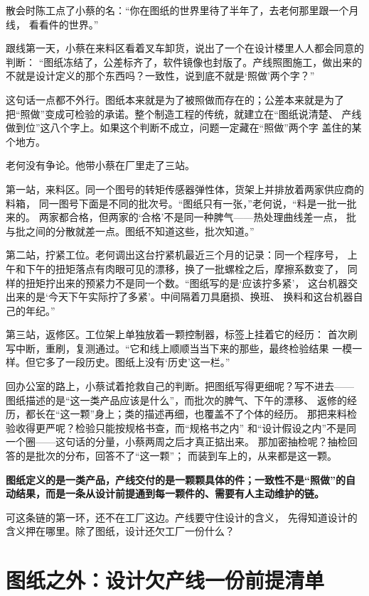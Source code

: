 散会时陈工点了小蔡的名：“你在图纸的世界里待了半年了，去老何那里跟一个月线，
看看件的世界。”

跟线第一天，小蔡在来料区看着叉车卸货，说出了一个在设计楼里人人都会同意的判断：
“图纸冻结了，公差标齐了，软件镜像也封版了。产线照图施工，做出来的
不就是设计定义的那个东西吗？一致性，说到底不就是‘照做’两个字？”

这句话一点都不外行。图纸本来就是为了被照做而存在的；公差本来就是为了
把“照做”变成可检验的承诺。整个制造工程的传统，就建立在“图纸说清楚、
产线做到位”这八个字上。如果这个判断不成立，问题一定藏在“照做”两个字
盖住的某个地方。

老何没有争论。他带小蔡在厂里走了三站。

第一站，来料区。同一个图号的转矩传感器弹性体，货架上并排放着两家供应商的料箱，
同一图号下面是不同的批次号。“图纸只有一张，”老何说，“料是一批一批来的。
两家都合格，但两家的‘合格’不是同一种脾气——热处理曲线差一点，
批与批之间的分散就差一点。图纸不知道这些，批次知道。”

第二站，拧紧工位。老何调出这台拧紧机最近三个月的记录：同一个程序号，
上午和下午的扭矩落点有肉眼可见的漂移，换了一批螺栓之后，摩擦系数变了，
同样的扭矩拧出来的预紧力不是同一个数。“图纸写的是‘应该拧多紧’，
这台机器交出来的是‘今天下午实际拧了多紧’。中间隔着刀具磨损、换班、
换料和这台机器自己的年纪。”

第三站，返修区。工位架上单独放着一颗控制器，标签上挂着它的经历：
首次刷写中断，重刷，复测通过。“它和线上顺顺当当下来的那些，最终检验结果
一模一样。但它多了一段历史。图纸上没有‘历史’这一栏。”

回办公室的路上，小蔡试着抢救自己的判断。把图纸写得更细呢？写不进去——
图纸描述的是“这一类产品应该是什么”，而批次的脾气、下午的漂移、
返修的经历，都长在“这一颗”身上；类的描述再细，也覆盖不了个体的经历。
那把来料检验收得更严呢？检验只能按规格书查，而“规格书之内”
和“设计假设之内”不是同一个圈——这句话的分量，小蔡两周之后才真正掂出来。
那加密抽检呢？抽检回答的是批次的分布，回答不了“这一颗”；
而装到车上的，从来都是这一颗。

\textbf{图纸定义的是一类产品，产线交付的是一颗颗具体的件；一致性不是“照做”的自动结果，而是一条从设计前提通到每一颗件的、需要有人主动维护的链。}

可这条链的第一环，还不在工厂这边。产线要守住设计的含义，
先得知道设计的含义押在哪里。除了图纸，设计还欠工厂一份什么？

\section{图纸之外：设计欠产线一份前提清单}

